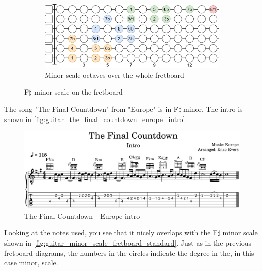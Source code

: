 \begin{figure}[h]
	\vspace{0.5cm}
	\begin{subfigure}[b]{\textwidth}
		\centering
		\includegraphics[height=0.175\textheight]{../../Images/guitar_minor_scale_octaves_over_fretboard.png}
		\caption{Minor scale octaves over the whole fretboard}
		\label{fig:guitar_minor_scale_octaves_over_fretboard}
	\end{subfigure}
	
	\caption{F$\sharp$ minor scale on the fretboard}
	\label{fig:guitar_minor_scale_fretboard}
\end{figure}

\clearpage

The song "The Final Countdown" from "Europe" is in F$\sharp$ minor. The intro is shown in \autoref{fig:guitar_the_final_countdown_europe_intro}.

\begin{figure}[h]
	\centering
	\includegraphics[width=\textwidth]{../../MuseScore/Guitar/GuitarTheFinalCountdownEuropeIntro.png}
	\caption{The Final Countdown - Europe intro}
	\label{fig:guitar_the_final_countdown_europe_intro}
\end{figure}

Looking at the notes used, you see that it nicely overlaps with the F$\sharp$ minor scale shown in \autoref{fig:guitar_minor_scale_fretboard_standard}. Just as in the previous fretboard diagrams, the numbers in the circles indicate the degree in the, in this case minor, scale.

